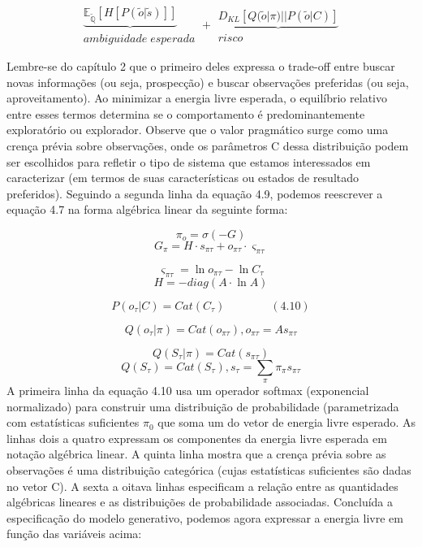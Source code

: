 \documentclass[
  12pt,
]{book}
\begin{document}
\[\begin{matrix} \underbrace{\mathbb{E_\tilde Q}[H[P(\tilde o|\tilde s)]]} \\ ambiguidade\;esperada  \end{matrix} +  \begin{matrix} \underbrace{D_{KL}[Q(\tilde o | \pi) || P(\tilde o | C)]} \\ risco \end{matrix}\]

Lembre-se do capítulo 2 que o primeiro deles expressa o trade-off entre
buscar novas informações (ou seja, prospecção) e buscar observações
preferidas (ou seja, aproveitamento). Ao minimizar a energia livre
esperada, o equilíbrio relativo entre esses termos determina se o
comportamento é predominantemente exploratório ou explorador. Observe
que o valor pragmático surge como uma crença prévia sobre observações,
onde os parâmetros C dessa distribuição podem ser escolhidos para
refletir o tipo de sistema que estamos interessados em caracterizar (em
termos de suas características ou estados de resultado preferidos).
Seguindo a segunda linha da equação 4.9, podemos reescrever a equação
4.7 na forma algébrica linear da seguinte forma:

\[\pi_o = \sigma(-G)\]
\[G_\pi = H\cdot  s_{\pi\tau} + o_{\pi\tau} \cdot \varsigma_{\pi\tau}\]

\[\varsigma_{\pi\tau} = \ln o_{\pi\tau} - \ln C_\tau \]
\[H = -diag(A \cdot \ln A)\]

\[P(o_\tau | C) = Cat(C_\tau) \qquad \qquad (4.10)\]

\[Q(o_\tau | \pi) = Cat(o_{\pi\tau}) , o_{\pi\tau} = As_{\pi\tau} \]

\[Q(S_\tau|\pi)=Cat(s_{\pi\tau})\]
\[Q(S_\tau)=Cat(S_\tau) , s_\tau = \sum_\pi \pi_\pi s_{\pi\tau} \] A
primeira linha da equação 4.10 usa um operador softmax (exponencial
normalizado) para construir uma distribuição de probabilidade
(parametrizada com estatísticas suficientes \(π_0\) que soma um do vetor
de energia livre esperado. As linhas dois a quatro expressam os
componentes da energia livre esperada em notação algébrica linear. A
quinta linha mostra que a crença prévia sobre as observações é uma
distribuição categórica (cujas estatísticas suficientes são dadas no
vetor C). A sexta a oitava linhas especificam a relação entre as
quantidades algébricas lineares e as distribuições de probabilidade
associadas. Concluída a especificação do modelo generativo, podemos
agora expressar a energia livre em função das variáveis acima:
\end{document}

